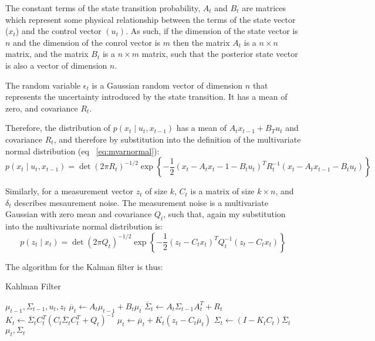 \documentclass[english]{article}
\begin{document}
The constant terms of the state transition probability, $A_t$ and $B_t$ are matrices which represent some physical relationship between the terms of the state vector ($x_t$) and the control vector $(u_t)$. As such, if the dimension of the state vector is $n$ and the dimension of the conrol vector is $m$ then the matrix $A_t$ is a $n \times n$ matrix, and the matrix $B_t$ is a $n \times m$ matrix, such that the posterior state vector is also a vector of dimension $n$. 

The random variable $\epsilon _t$ is a Gaussian random vector of dimension $n$ that represents the uncertainty introduced by the state transition. It has a mean of zero, and covariance $R_t$.

Therefore, the distribution of $p(x_t \mid u_t, x_{t-1})$ has a mean of $A_t x_{t-1} + B_T u_t$ and covariance $R_t$, and therefore by substitution into the definition of the multivariate normal distribution (eq ~\ref{eq:mvarnormal}):
\begin{equation}
	p(x_t \mid u_t, x_{t-1}) = \det(2 \pi R_t)^{-1/2} \exp\left\{-\frac{1}{2}(x_t - A_t x_t-1 - B_t u_t)^T R_t^{-1}(x_t - A_t x_{t-1} - B_t u_t)\right\}
\end{equation}

Similarly, for a measurement vector $z_t$ of size $k$, $C_t$ is a matrix of size $k \times n$, and $\delta_t$ describes mesaurement noise. The measurement noise is a multivariate Gaussian with zero mean and covariance $Q_t$, such that, again my substitution into the multivariate normal distribution is:
\begin{equation}
	p(z_t \mid x_t) = \det(2 \pi Q_t)^{-1/2} \exp\left\{-\frac{1}{2}(z_t - C_t x_t)^T Q_t^{-1}(z_t - C_t x_t)\right\}
\end{equation}

The algorithm for the Kalman filter is thus:

\begin{algorithm}
\caption{Kahlman Filter}
\label{alg:kalman}
\begin{algorithmic}
	\REQUIRE $\mu_{t-1}, \Sigma_{t-1}, u_t, z_t$
	\STATE $\overline{\mu}_t \leftarrow A_t\mu_{t-1} + B_t \mu_t$
	\STATE $\overline{\Sigma}_t \leftarrow A_t \Sigma_{t-1}A_t^T + R_t$
	\STATE
	\STATE $K_t \leftarrow \overline{\Sigma}_t C_t^T\left(C_t \overline{\Sigma}_t C_t^T + Q_t\right)^{-1}$
	\STATE $\mu_t \leftarrow \overline{\mu}_t + K_t\left(z_t - C_t \overline{\mu}_t\right)$
	\STATE $\Sigma_t \leftarrow (I-K_t C_t)\overline{\Sigma}_t$
	\RETURN $\mu_t, \Sigma_t$
\end{algorithmic}
\end{algorithm}
\end{document}

